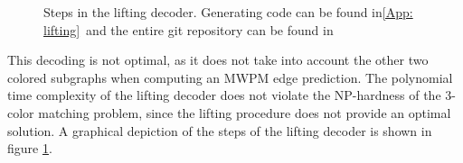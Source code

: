 \begin{figure}[h!]
    \centering
    \hfill
    \hfill
    \hfill
    \caption{Steps in the lifting decoder. Generating code can be found in\ref{App: lifting}\
    and the entire git repository can be found in \cite{clemens}}
    \label{fig: lifting}
\end{figure}
This decoding is not optimal, as it does not take into account the other two colored
subgraphs when computing an MWPM edge prediction.
The polynomial time complexity of the lifting decoder does not
violate the NP-hardness of the 3-color matching problem, since the 
lifting procedure does not provide an optimal solution.
A graphical depiction of the steps of the lifting decoder is shown in
figure \ref{fig: lifting}.
\newpage